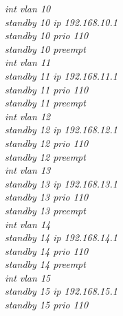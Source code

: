 \documentclass[a4paper, 12pt]{article}
\begin{document}
\hspace*{2cm}\textit{int vlan 10\\
\hspace*{2cm}standby 10 ip 192.168.10.1\\
\hspace*{2cm}standby 10 prio 110\\
\hspace*{2cm}standby 10 preempt\\
\hspace*{2cm}int vlan 11\\
\hspace*{2cm}standby 11 ip 192.168.11.1\\
\hspace*{2cm}standby 11 prio 110\\
\hspace*{2cm}standby 11 preempt\\
\hspace*{2cm}int vlan 12\\
\hspace*{2cm}standby 12 ip 192.168.12.1\\
\hspace*{2cm}standby 12 prio 110\\
\hspace*{2cm}standby 12 preempt\\
\hspace*{2cm}int vlan 13\\
\hspace*{2cm}standby 13 ip 192.168.13.1\\
\hspace*{2cm}standby 13 prio 110\\
\hspace*{2cm}standby 13 preempt\\
\hspace*{2cm}int vlan 14\\
\hspace*{2cm}standby 14 ip 192.168.14.1\\
\hspace*{2cm}standby 14 prio 110\\
\hspace*{2cm}standby 14 preempt\\
\hspace*{2cm}int vlan 15\\
\hspace*{2cm}standby 15 ip 192.168.15.1\\
\hspace*{2cm}standby 15 prio 110\\
}
\end{document}

